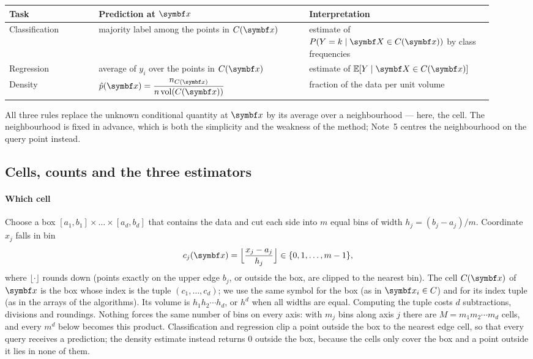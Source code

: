 \documentclass[11pt]{article}
\begin{document}
\begin{center}\small
\begin{tabular}{@{}L{0.17\linewidth}L{0.4\linewidth}L{0.35\linewidth}@{}}
\toprule
Task & Prediction at $\x$ & Interpretation \\
\midrule
Classification & majority label among the points in $C(\x)$ & estimate of $P(Y = k \mid \X \in C(\x))$ by class frequencies \\
Regression & average of $y_i$ over the points in $C(\x)$ & estimate of $\E[Y \mid \X \in C(\x)]$ \\
Density & $\hat p(\x) = \dfrac{n_{C(\x)}}{n\,\mathrm{vol}(C(\x))}$ & fraction of the data per unit volume \\
\bottomrule
\end{tabular}
\end{center}

All three rules replace the unknown conditional quantity at $\x$ by its average over a neighbourhood --- here, the
cell. The neighbourhood is fixed in advance, which is both the simplicity and the weakness of the method; Note~5
centres the neighbourhood on the query point instead.

\subsection{Cells, counts and the three estimators}\label{sec:formulas}

\paragraph{Which cell} Choose a box $[a_1, b_1] \times \dots \times [a_d, b_d]$ that contains the data and cut each
side into $m$ equal bins of width $h_j = (b_j - a_j)/m$. Coordinate $x_j$ falls in bin
\begin{equation}\label{eq:binindex}
  c_j(\x) = \Big\lfloor \frac{x_j - a_j}{h_j} \Big\rfloor \in \{0, 1, \dots, m - 1\},
\end{equation}
where $\lfloor\cdot\rfloor$ rounds down (points exactly on the upper edge $b_j$, or outside the box, are clipped to
the nearest bin). The cell $C(\x)$ of $\x$ is the box whose index is the tuple $(c_1, \dots, c_d)$; we use the same symbol for the
box (as in $\x_i \in C$) and for its index tuple (as in the arrays of the algorithms). Its volume is
$h_1 h_2 \cdots h_d$, or $h^d$ when all widths are equal. Computing the tuple costs $d$ subtractions, divisions and
roundings. Nothing forces the same number of bins on every axis: with $m_j$ bins along axis $j$ there are
$M = m_1 m_2 \cdots m_d$ cells, and every $m^d$ below becomes this product. Classification and regression clip a
point outside the box to the nearest edge cell, so that every query receives a prediction; the density estimate
instead returns 0 outside the box, because the cells only cover the box and a point outside it lies in none of
them.
\end{document}
